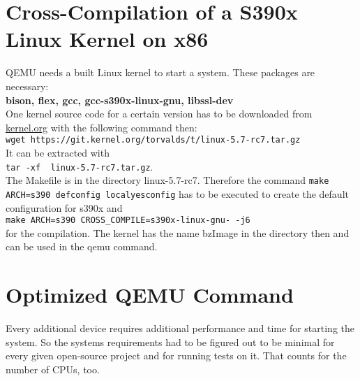 \section{Cross-Compilation of a S390x Linux Kernel on x86}

QEMU needs a built Linux kernel to start a system. These packages are necessary: \\
\textbf{bison, flex, gcc, gcc-s390x-linux-gnu, libssl-dev} \\
One kernel source code for a certain version has to be downloaded from \url{kernel.org} with the following command then: \\ \lstinline!wget https://git.kernel.org/torvalds/t/linux-5.7-rc7.tar.gz!\\
It can be extracted with \\ 
\lstinline!tar -xf  linux-5.7-rc7.tar.gz!. \\ 
The Makefile is in the directory linux-5.7-rc7. Therefore the command \lstinline!make ARCH=s390 defconfig localyesconfig! has to be executed to create the default configuration for s390x and \\  
\lstinline!make ARCH=s390 CROSS_COMPILE=s390x-linux-gnu- -j6! \\
for the compilation. The kernel has the name bzImage in the directory  then and can be used in the qemu command.

\section{Optimized QEMU Command}\label{Optimized-Qemu-Command}

Every additional device requires additional performance and time for starting the system. 
So the systems requirements had to be figured out to be minimal for every given open-source project and for running tests on it. 
That counts for the number of CPUs, too. \\

